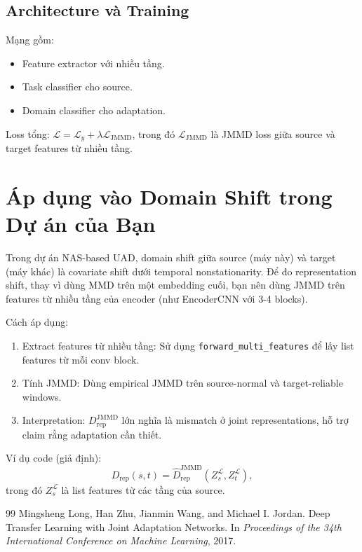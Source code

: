 \documentclass[a4paper]{article}
\begin{document}
\subsection{Architecture và Training}

Mạng gồm:
\begin{itemize}
    \item Feature extractor với nhiều tầng.
    \item Task classifier cho source.
    \item Domain classifier cho adaptation.
\end{itemize}

Loss tổng: $\mathcal{L} = \mathcal{L}_y + \lambda \mathcal{L}_{\mathrm{JMMD}}$, trong đó $\mathcal{L}_{\mathrm{JMMD}}$ là JMMD loss giữa source và target features từ nhiều tầng.

\section{Áp dụng vào Domain Shift trong Dự án của Bạn}

Trong dự án NAS-based UAD, domain shift giữa source (máy này) và target (máy khác) là covariate shift dưới temporal nonstationarity. Để đo representation shift, thay vì dùng MMD trên một embedding cuối, bạn nên dùng JMMD trên features từ nhiều tầng của encoder (như EncoderCNN với 3-4 blocks).

Cách áp dụng:
\begin{enumerate}[label=\arabic*.]
    \item Extract features từ nhiều tầng: Sử dụng \texttt{forward\_multi\_features} để lấy list features từ mỗi conv block.
    \item Tính JMMD: Dùng empirical JMMD trên source-normal và target-reliable windows.
    \item Interpretation: $D_{\mathrm{rep}}^{\mathrm{JMMD}}$ lớn nghĩa là mismatch ở joint representations, hỗ trợ claim rằng adaptation cần thiết.
\end{enumerate}

Ví dụ code (giả định):
\[
D_{\mathrm{rep}}(s,t) = \widehat{D}_{\mathrm{rep}}^{\mathrm{JMMD}}(Z_s^{\mathcal{L}}, Z_t^{\mathcal{L}}),
\]
trong đó $Z_s^{\mathcal{L}}$ là list features từ các tầng của source.

\begin{thebibliography}{99}
Mingsheng Long, Han Zhu, Jianmin Wang, and Michael I. Jordan.
\newblock Deep Transfer Learning with Joint Adaptation Networks.
\newblock In \emph{Proceedings of the 34th International Conference on Machine Learning}, 2017.
\end{thebibliography}
\end{document}
